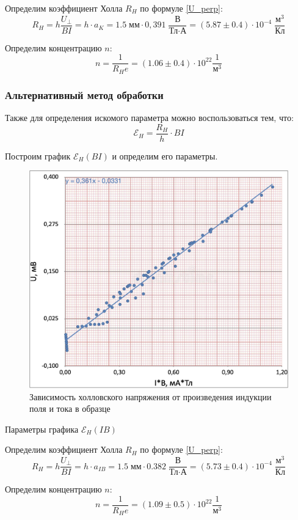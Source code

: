\documentclass[12pt,a4paper]{article}
\begin{document}
	Определим коэффициент Холла $R_H$ по формуле \eqref{U_perp}:
	$$ R_H = h \frac{U_\perp}{BI} = h \cdot a_K = 1.5 \; \text{мм} \cdot 0,391 \; \frac{\text{В}}{\text{Тл} \cdot \text{А}} = (5.87 \pm 0.4) \cdot 10^{-4} \; \frac{\text{м}^3}{\text{Кл}} $$
	
	Определим концентрацию $n$:
	$$ n = \frac{1}{R_H e} = (1.06 \pm 0.4) \cdot 10^{22} \frac{1}{\text{м}^3} $$
	
	\subsubsection*{Альтернативный метод обработки}
	
	Также для определения искомого параметра можно воспользоваться тем, что:
	$$ \mathcal{E}_H = \frac{R_H}{h} \cdot BI $$
	
	Построим график $\mathcal{E}_H (BI)$ и определим его параметры.
	
	\begin{figure}[H]
		\includegraphics[width = 10 cm]{src/hallEMF_UIB.png}
		\caption{Зависимость холловского напряжения от произведения индукции поля и тока в образце}
	\end{figure}
	
	\begin{table}[h]
		\caption{Параметры графика $\mathcal{E}_H (IB)$}
		
	\end{table}

	Определим коэффициент Холла $R_H$ по формуле \eqref{U_perp}:
	$$ R_H = h \frac{U_\perp}{BI} = h \cdot a_{IB} = 1.5 \; \text{мм} \cdot 0.382 \; \frac{\text{В}}{\text{Тл} \cdot \text{А}} = (5.73 \pm 0.4) \cdot 10^{-4} \; \frac{\text{м}^3}{\text{Кл}} $$
	
	Определим концентрацию $n$:
	$$ n = \frac{1}{R_H e} = (1.09 \pm 0.5) \cdot 10^{22} \frac{1}{\text{м}^3} $$
	
\end{document}
